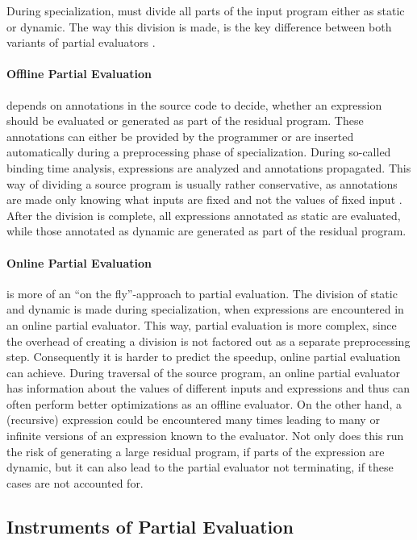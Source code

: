 During specialization, must divide all parts of the input program either as static or dynamic.
The way this division is made, is the key difference between both variants of partial evaluators .

\paragraph{Offline Partial Evaluation}
depends on annotations in the source code to decide, whether an expression should be evaluated or generated as part of the residual program.
These annotations can either be provided by the programmer or are inserted automatically during a preprocessing phase of specialization.
During so-called binding time analysis, expressions are analyzed and annotations propagated.
This way of dividing a source program is usually rather conservative, as annotations are made only knowing what inputs are fixed and not the values of fixed input .
After the division is complete, all expressions annotated as static are evaluated, while those annotated as dynamic are generated as part of the residual program.


\paragraph{Online Partial Evaluation}
is more of an \enquote{on the fly}-approach to partial evaluation.
The division of static and dynamic is made during specialization, when expressions are encountered in an online partial evaluator.
This way, partial evaluation is more complex, since the overhead of creating a division is not factored out as a separate preprocessing step.
Consequently it is harder to predict the speedup, online partial evaluation can achieve.
During traversal of the source program, an online partial evaluator has information about the values of different inputs and expressions and thus can often perform better optimizations as an offline evaluator.
On the other hand, a (recursive) expression could be encountered many times leading to many or infinite versions of an expression known to the evaluator.
Not only does this run the risk of generating a large residual program, if parts of the expression are dynamic, but it can also lead to the partial evaluator not terminating, if these cases are not accounted for.


\subsection{Instruments of Partial Evaluation}\label{sec:pe-instruments}

